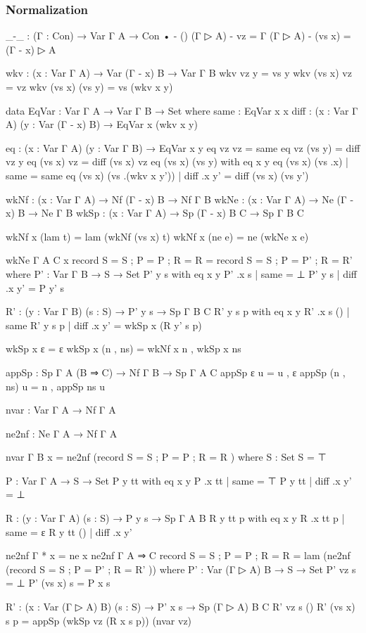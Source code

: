 \subsubsection*{Normalization}

\begin{code}[hide]
_-_ : (Γ : Con) → Var Γ A → Con
• - ()
(Γ ▷ A) - vz = Γ
(Γ ▷ A) - (vs x) = (Γ - x) ▷ A

wkv : (x : Var Γ A) → Var (Γ - x) B → Var Γ B
wkv vz y = vs y
wkv (vs x) vz = vz
wkv (vs x) (vs y) = vs (wkv x y)

data EqVar : Var Γ A → Var Γ B → Set where
  same : EqVar x x
  diff : (x : Var Γ A) (y : Var (Γ - x) B) → EqVar x (wkv x y)

eq : (x : Var Γ A) (y : Var Γ B) → EqVar x y
eq vz vz = same
eq vz (vs y) = diff vz y
eq (vs x) vz = diff (vs x) vz
eq (vs x) (vs y) with eq x y
eq (vs x) (vs .x)          | same = same
eq (vs x) (vs .(wkv x y')) | diff .x y' = diff (vs x) (vs y')

wkNf : (x : Var Γ A) → Nf (Γ - x) B → Nf Γ B
wkNe : (x : Var Γ A) → Ne (Γ - x) B → Ne Γ B
wkSp : (x : Var Γ A) → Sp (Γ - x) B C → Sp Γ B C

wkNf x (lam t) = lam (wkNf (vs x) t)
wkNf x (ne e) = ne (wkNe x e)

wkNe {Γ} {A} {C} x record { S = S ; P = P ; R = R }
  = record { S = S ; P = P' ; R = R' }
  where
  P' : Var Γ B → S → Set
  P' y  s with eq x y
  P' .x s | same = ⊥
  P' y  s | diff .x y' = P y' s

  R' : (y : Var Γ B) (s : S) → P' y s → Sp Γ B C
  R' y  s p with eq x y
  R' .x s () | same
  R' y  s p  | diff .x y' = wkSp x (R y' s p)

wkSp x ε = ε
wkSp x (n , ns) = wkNf x n , wkSp x ns

appSp : Sp Γ A (B ⇒ C) → Nf Γ B → Sp Γ A C
appSp ε u = u , ε
appSp (n , ns) u = n , appSp ns u
\end{code}

\begin{code}
nvar : Var Γ A → Nf Γ A
\end{code}

\begin{code}[hide]
ne2nf : Ne Γ A → Nf Γ A

nvar {Γ} {B} x =
  ne2nf (record { S = S ; P = P ; R = R })
  where
  S : Set
  S = ⊤
  
  P : Var Γ A → S → Set
  P y  tt with eq x y
  P .x tt | same = ⊤
  P y  tt | diff .x y' = ⊥

  R : (y : Var Γ A) (s : S) → P y s → Sp Γ A B
  R y tt p with eq x y
  R .x tt p | same = ε
  R y tt () | diff .x y'

ne2nf {Γ} {*} x = ne x
ne2nf {Γ} {A ⇒ C} record { S = S ; P = P ; R = R } =
  lam (ne2nf (record { S = S ; P = P' ; R = R' }))
  where
  P' : Var (Γ ▷ A) B → S → Set
  P' vz s = ⊥
  P' (vs x) s = P x s

  R' : (x : Var (Γ ▷ A) B) (s : S) → P' x s → Sp (Γ ▷ A) B C
  R' vz s ()
  R' (vs x) s p = appSp (wkSp vz (R x s p)) (nvar vz)
\end{code}

